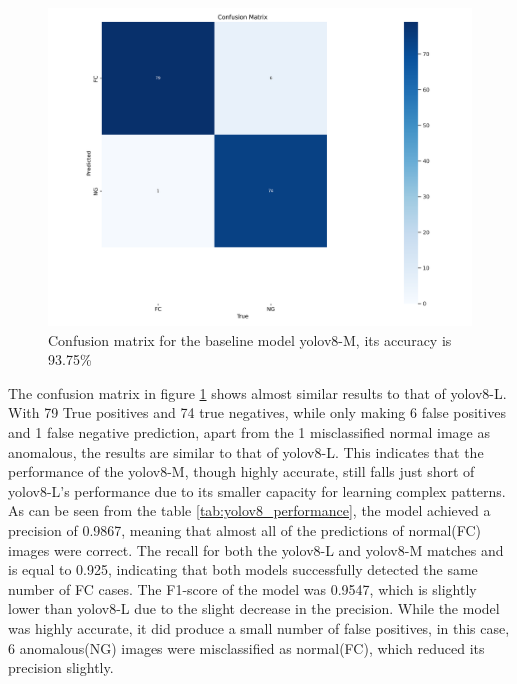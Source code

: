 \begin{figure}[!ht]
    \centering
    \includegraphics[width=0.9\linewidth]{Rohit_Master_Thesis//Images/yolov8m_confusion_matrix.png}
    \caption{Confusion matrix for the baseline model \gls{yolo}v8-M, its accuracy is 93.75\%}
    \label{fig:yolov8m confusion matrix}
\end{figure}

\FloatBarrier

The confusion matrix in figure \ref{fig:yolov8m confusion matrix} shows almost similar results to that of \gls{yolo}v8-L. With 79 True positives and 74 true negatives, while only making 6 false positives and 1 false negative prediction, apart from the 1 misclassified normal image as anomalous, the results are similar to that of \gls{yolo}v8-L. This indicates that the performance of the \gls{yolo}v8-M, though highly accurate, still falls just short of \gls{yolo}v8-L's performance due to its smaller capacity for learning complex patterns. As can be seen from the table \ref{tab:yolov8_performance}, the model achieved a precision of 0.9867, meaning that almost all of the predictions of normal(FC) images were correct. The recall for both the \gls{yolo}v8-L and \gls{yolo}v8-M matches and is equal to 0.925, indicating that both models successfully detected the same number of FC cases. The F1-score of the model was 0.9547, which is slightly lower than \gls{yolo}v8-L due to the slight decrease in the precision. While the model was highly accurate, it did produce a small number of false positives, in this case, 6 anomalous(NG) images were misclassified as normal(FC), which reduced its precision slightly.


